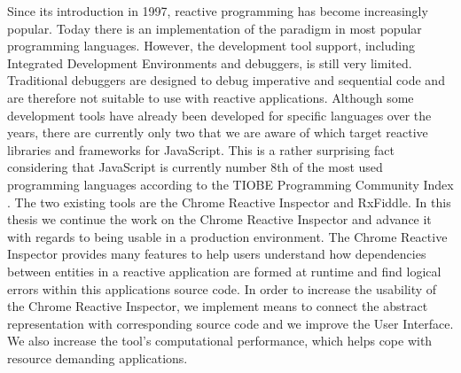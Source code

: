 Since its introduction in 1997, reactive programming has become increasingly popular. Today there is an implementation of the paradigm in most popular programming languages. However, the development tool support, including Integrated Development Environments and debuggers, is still very limited. Traditional debuggers are designed to debug imperative and sequential code and are therefore not suitable to use with reactive applications. Although some development tools have already been developed for specific languages over the years, there are currently only two that we are aware of which target reactive libraries and frameworks for JavaScript. This is a rather surprising fact considering that JavaScript is currently number 8th of the most used programming languages according to the TIOBE Programming Community Index \cite{LanguageIndex}. The two existing tools are the Chrome Reactive Inspector and RxFiddle.
In this thesis we continue the work on the Chrome Reactive Inspector and advance it with regards to being usable in a production environment. The Chrome Reactive Inspector provides many features to help users understand how dependencies between entities in a reactive application are formed at runtime and find logical errors within this applications source code. In order to increase the usability of the Chrome Reactive Inspector, we implement means to connect the abstract representation with corresponding source code and we improve the User Interface. We also increase the tool's computational performance, which helps cope with resource demanding applications.